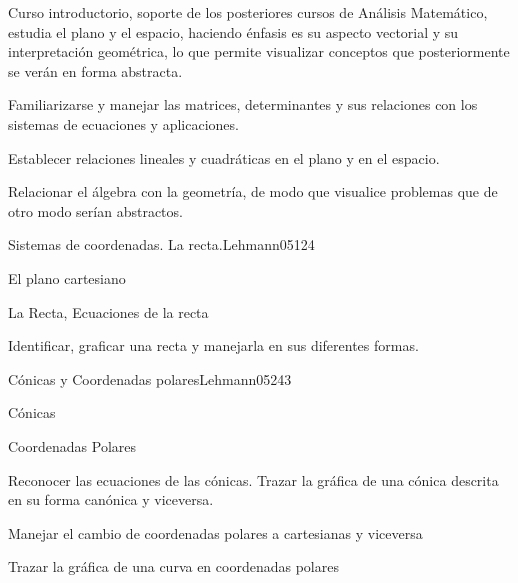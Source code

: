 \begin{syllabus}


\begin{justification}
Curso introductorio, soporte de los posteriores cursos de Análisis Matemático, 
estudia el plano y el espacio, haciendo énfasis es su aspecto vectorial y su interpretación geométrica, 
lo que permite visualizar conceptos que posteriormente se verán en forma abstracta.
\end{justification}

\begin{goals}
\item Familiarizarse y manejar las matrices, determinantes y sus relaciones con los sistemas de ecuaciones y aplicaciones.
\item Establecer relaciones lineales y cuadráticas en el plano y en el espacio.
\item Relacionar el álgebra con la geometría, de modo que visualice problemas que de otro modo serían abstractos.
\end{goals}

\begin{outcomes}
\end{outcomes}

\begin{unit}{Sistemas de coordenadas. La recta.}{Lehmann05}{12}{4}
   \begin{topics}
      \item El plano cartesiano
      \item La Recta, Ecuaciones de la recta
   \end{topics}
   \begin{unitgoals}
      \item Identificar, graficar una recta y manejarla en sus diferentes formas.
   \end{unitgoals}
\end{unit}

\begin{unit}{Cónicas y Coordenadas polares}{Lehmann05}{24}{3}
   \begin{topics}
      \item Cónicas
      \item Coordenadas Polares
   \end{topics}

   \begin{unitgoals}
      \item Reconocer las ecuaciones de las cónicas. Trazar la gráfica de una cónica descrita en su forma canónica y viceversa.
      \item Manejar el cambio de coordenadas polares a cartesianas y viceversa
      \item Trazar la gráfica de una curva en coordenadas polares
      \end{unitgoals}
\end{unit}


\end{syllabus}
